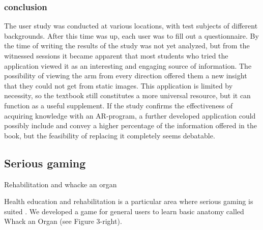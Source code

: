 \subsubsection{conclusion}
The user study was conducted at various locations, with test subjects of different backgrounds. 
After this time was up, each user was to fill out a questionnaire.
By the time of writing the results of the study was not yet analyzed, but from the witnessed sessions it became apparent that most students who tried the application viewed it as an interesting and engaging source of information. The possibility of viewing the arm from every direction offered them a new insight that they could not get from static images. This application is limited by necessity, so the textbook still constitutes a more universal resource, but it can function as a useful supplement. If the study confirms the effectiveness of acquiring knowledge with an AR-program, a further developed application could possibly include and convey a higher percentage of the information offered in the book, but the feasibility of replacing it completely seems debatable.

\subsection{Serious gaming} \label{sec:3-IMR:gaming}
Rehabilitation and whacke an organ

Health education and rehabilitation is a particular area where serious gaming is suited \cite{Aubin2012,Jonas2012}. We developed a game for general users to learn basic anatomy called Whack an Organ (see Figure 3-right).

